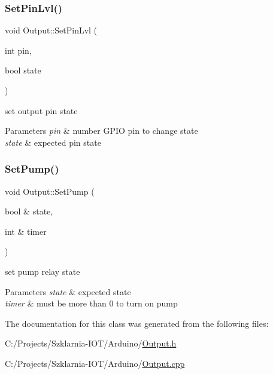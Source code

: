\subsubsection{\texorpdfstring{Set\+Pin\+Lvl()}{SetPinLvl()}}
{\footnotesize\ttfamily void Output\+::\+Set\+Pin\+Lvl (\begin{DoxyParamCaption}\item[{int}]{pin,  }\item[{bool}]{state }\end{DoxyParamCaption})\hspace{0.3cm}{\ttfamily [private]}}



set output pin state 


\begin{DoxyParams}{Parameters}
{\em pin} & number G\+P\+IO pin to change state \\
\hline
{\em state} & expected pin state \\
\hline
\end{DoxyParams}
\mbox{\label{class_output_a3d0ab08436b9c18861a2ae060f0aec88}} 
\subsubsection{\texorpdfstring{Set\+Pump()}{SetPump()}}
{\footnotesize\ttfamily void Output\+::\+Set\+Pump (\begin{DoxyParamCaption}\item[{bool \&}]{state,  }\item[{int \&}]{timer }\end{DoxyParamCaption})}



set pump relay state 


\begin{DoxyParams}{Parameters}
{\em state} & expected state \\
\hline
{\em timer} & must be more than 0 to turn on pump \\
\hline
\end{DoxyParams}


The documentation for this class was generated from the following files\+:\begin{DoxyCompactItemize}
\item 
C\+:/\+Projects/\+Szklarnia-\/\+I\+O\+T/\+Arduino/\hyperlink{_output_8h}{Output.\+h}\item 
C\+:/\+Projects/\+Szklarnia-\/\+I\+O\+T/\+Arduino/\hyperlink{_output_8cpp}{Output.\+cpp}\end{DoxyCompactItemize}
